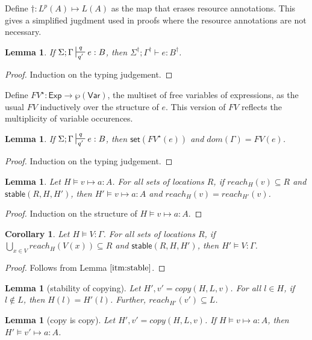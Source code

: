 \documentclass{easychair}
\newcommand{\ms}[1]{\ensuremath{\mathsf{#1}}}
\newcommand{\stable}[1]{\mathsf{stable}(#1)}
\newcommand{\set}[1]{\mathsf{set}(#1)}
\newtheorem{lemma}[theorem]{Lemma}
\newtheorem{corollary}[theorem]{Corollary}
\theoremstyle{definition}
\begin{document}
Define $\dagger :  L^p(A) \mapsto L(A)$ as the map that erases resource annotations. 
This gives a simplified jugdment 
used in proofs where the resource annotations are not necessary.

\begin{lemma}
\label{a} If $\Sigma; \Gamma \sststile{q'}{q} e : B$, then $\Sigma^{\dagger}; \Gamma^{\dagger} \vdash e : B^{\dagger}$.
\end{lemma}

\begin{proof}
Induction on the typing judgement.
\end{proof}

Define $FV^{\star} : \ms{Exp} \to \wp(\ms{Var})$, the multiset of free variables of expressions,
as the usual $FV$ inductively over the structure of $e$. This version of $FV$ reflects 
the multiplicity of variable occurences.

\begin{lemma}\label{itm:linear}
\label{a} If $\Sigma; \Gamma \sststile{q'}{q} e : B$, then $\set{FV^{\star}(e)}$ and $dom(\Gamma) = FV(e)$.
\end{lemma}

\begin{proof}
Induction on the typing judgement.
\end{proof}

\begin{lemma}\label{itm:stable}
Let $H \vDash v \mapsto a : A$. For all sets of locations $R$, if $reach_H(v) \subseteq R$ and $\stable{R,H,H'}$, then $H' \vDash v \mapsto a : A$ and $reach_H(v) = reach_{H'}(v)$.
\end{lemma}

\begin{proof}
Induction on the structure of $H \vDash v \mapsto a : A$.
\end{proof}

\begin{corollary}
Let $H \vDash V : \Gamma$. For all sets of locations $R$, if $\bigcup_{x \in V} reach_H(V(x)) \subseteq R$ and $\stable{R,H,H'}$, then $H' \vDash V : \Gamma$.
\end{corollary}

\begin{proof}
Follows from Lemma $\ref{itm:stable}$.
\end{proof}


\begin{lemma}[stability of copying]
	Let $H',v' = copy(H,L,v)$. For all $l \in H$, if $l \notin L$, then $H(l) = H'(l)$. 
	Further, $reach_{H'}(v') \subseteq L$.
\end{lemma}

\begin{lemma}[copy is copy]
	Let $H',v' = copy(H,L,v)$. If $H \vDash v \mapsto a : A$, then $H' \vDash v' \mapsto a : A$.
\end{lemma}



\end{document}
